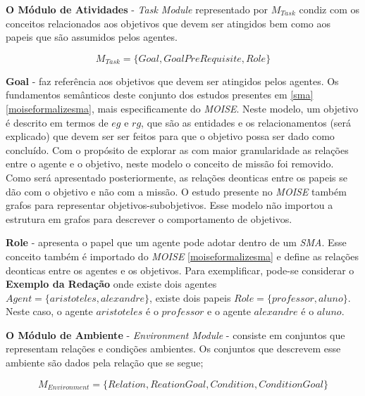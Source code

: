 \textbf{O Módulo de Atividades} - \textit{Task Module} representado por $M_{Task}$ condiz com os conceitos relacionados aos objetivos que devem ser atingidos bem como aos papeis que são assumidos pelos agentes. 

\begin{equation}
    M_{Task} = \{ Goal, GoalPreRequisite, Role \}
\end{equation}

\textbf{Goal} - faz referência aos objetivos que devem ser atingidos pelos agentes. Os fundamentos semânticos deste conjunto dos estudos presentes em \ref{sma} \ref{moiseformalizesma}, mais especificamente do \textit{MOISE}. Neste modelo, um objetivo é descrito em termos de $eg$ e $rg$, que são as entidades e os relacionamentos (será explicado) que devem ser ser feitos para que o objetivo possa ser dado como concluído. Com o propósito de explorar as com maior granularidade as relações entre o agente e o objetivo, neste modelo o conceito de missão foi removido. Como será apresentado posteriormente, as relações deonticas entre os papeis se dão com o objetivo e não com a missão. O estudo presente no \textit{MOISE} também grafos para representar objetivos-subobjetivos. Esse modelo não importou a estrutura em grafos para descrever o comportamento de objetivos. 

\textbf{Role} - apresenta o papel que um agente pode adotar dentro de um \textit{SMA}. Esse conceito também é importado do \textit{MOISE} 
\ref{moiseformalizesma} e define as relações deonticas entre os agentes e os objetivos. Para exemplificar, pode-se considerar o \textbf{Exemplo da Redação} onde existe dois agentes $Agent = \{ aristoteles, alexandre \}$, existe dois papeis $Role = \{ professor, aluno\}$. Neste caso, o agente $aristoteles$ é o $professor$ e o agente $alexandre$ é o $aluno$.

\textbf{O Módulo de Ambiente} - \textit{Environment Module} - consiste em conjuntos que representam relações e condições ambientes.
Os conjuntos que descrevem esse ambiente são dados pela relação que se segue;

\begin{equation}
    M_{Environment} = \{ Relation, ReationGoal, Condition, ConditionGoal \}
\end{equation}

